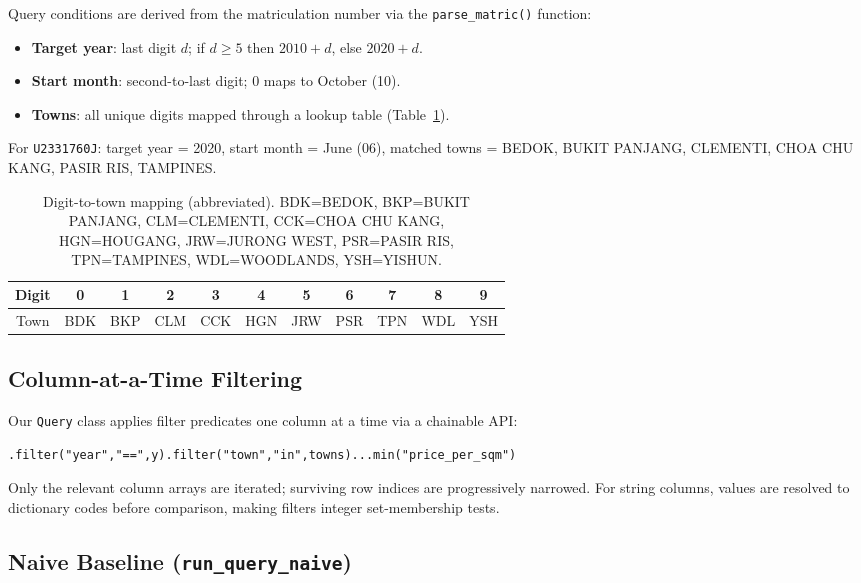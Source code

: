\documentclass[11pt,a4paper]{article}
\begin{document}
Query conditions are derived from the matriculation number via the \texttt{parse\_matric()} function:

\begin{itemize}[nosep]
    \item \textbf{Target year}: last digit $d$; if $d \geq 5$ then $2010 + d$, else $2020 + d$.
    \item \textbf{Start month}: second-to-last digit; 0 maps to October (10).
    \item \textbf{Towns}: all unique digits mapped through a lookup table (Table~\ref{tab:towns}).
\end{itemize}

For \texttt{U2331760J}: target year = 2020, start month = June (06), matched towns = BEDOK, BUKIT PANJANG, CLEMENTI, CHOA CHU KANG, PASIR RIS, TAMPINES.

\begin{table}[H]
\centering
\small
\begin{tabular}{c|cccccccccc}
\toprule
Digit & 0 & 1 & 2 & 3 & 4 & 5 & 6 & 7 & 8 & 9 \\
\midrule
Town & BDK & BKP & CLM & CCK & HGN & JRW & PSR & TPN & WDL & YSH \\
\bottomrule
\end{tabular}
\caption{Digit-to-town mapping (abbreviated). BDK=BEDOK, BKP=BUKIT PANJANG, CLM=CLEMENTI, CCK=CHOA CHU KANG, HGN=HOUGANG, JRW=JURONG WEST, PSR=PASIR RIS, TPN=TAMPINES, WDL=WOODLANDS, YSH=YISHUN.}
\label{tab:towns}
\end{table}

\subsection{Column-at-a-Time Filtering}

Our \texttt{Query} class applies filter predicates one column at a time via a chainable API:
\begin{verbatim}
.filter("year","==",y).filter("town","in",towns)...min("price_per_sqm")
\end{verbatim}
Only the relevant column arrays are iterated; surviving row indices are progressively narrowed. For string columns, values are resolved to dictionary codes before comparison, making filters integer set-membership tests.

\subsection{Naive Baseline (\texttt{run\_query\_naive})}
\end{document}
